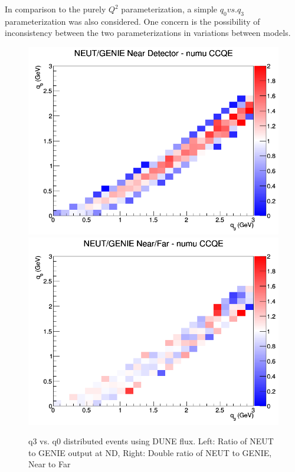 \documentclass[12pt]{article}
\begin{document}
In comparison to the purely $Q^2$ parameterization, a simple $q_0 vs. q_3$ parameterization was also considered. One concern is the possibility of inconsistency between the two parameterizations in variations between models. 
\begin{figure}[h]
\includegraphics[width=\linewidth]{q0_q3/nominal/ratios/CCQE_NEUT_GENIE_numu_near_q3_q0.png}
\endminipage
{}
\includegraphics[width=\linewidth]{q0_q3/nominal/ratios/CCQE_NEUT_GENIE_numu_NF_q3_q0.png}
\endminipage
\caption{q3 vs. q0 distributed events using DUNE flux. Left: Ratio of NEUT to GENIE output at ND, Right: Double ratio of NEUT to GENIE, Near to Far}
\end{figure}
\end{document}
